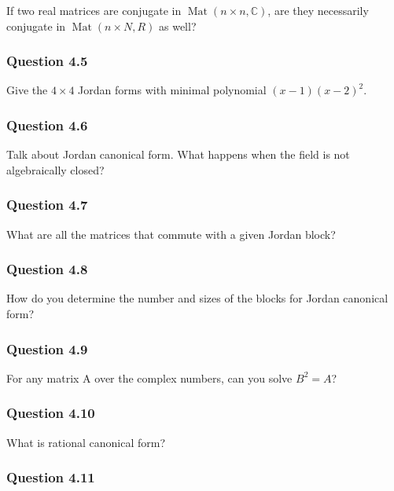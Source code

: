 If two real matrices are conjugate in
\(\operatorname{Mat}(n\times n, {\mathbb{C}})\), are they necessarily
conjugate in \(\operatorname{Mat}(n \times N, R)\) as well?

\hypertarget{question-4.5}{%
\subsubsection{Question 4.5}\label{question-4.5}}

Give the \(4 \times 4\) Jordan forms with minimal polynomial
\((x - 1)(x - 2)^2\).

\hypertarget{question-4.6}{%
\subsubsection{Question 4.6}\label{question-4.6}}

Talk about Jordan canonical form. What happens when the field is not
algebraically closed?

\hypertarget{question-4.7}{%
\subsubsection{Question 4.7}\label{question-4.7}}

What are all the matrices that commute with a given Jordan block?

\hypertarget{question-4.8}{%
\subsubsection{Question 4.8}\label{question-4.8}}

How do you determine the number and sizes of the blocks for Jordan
canonical form?

\hypertarget{question-4.9}{%
\subsubsection{Question 4.9}\label{question-4.9}}

For any matrix A over the complex numbers, can you solve \(B^2 = A\)?

\hypertarget{question-4.10}{%
\subsubsection{Question 4.10}\label{question-4.10}}

What is rational canonical form?

\hypertarget{question-4.11}{%
\subsubsection{Question 4.11}\label{question-4.11}}

